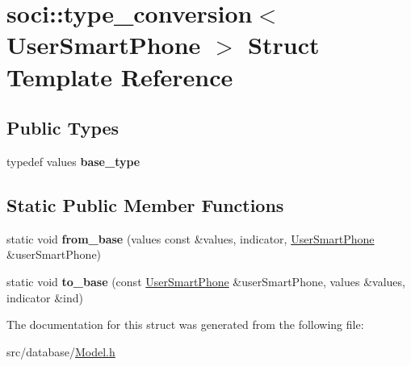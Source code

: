\hypertarget{structsoci_1_1type__conversion_3_01_user_smart_phone_01_4}{\section{soci\-:\-:type\-\_\-conversion$<$ User\-Smart\-Phone $>$ Struct Template Reference}
\label{structsoci_1_1type__conversion_3_01_user_smart_phone_01_4}
}
\subsection*{Public Types}
\begin{DoxyCompactItemize}
\item 
\hypertarget{structsoci_1_1type__conversion_3_01_user_smart_phone_01_4_abe60a4895d503867627343a2a70d5f0e}{typedef values {\bfseries base\-\_\-type}}\label{structsoci_1_1type__conversion_3_01_user_smart_phone_01_4_abe60a4895d503867627343a2a70d5f0e}

\end{DoxyCompactItemize}
\subsection*{Static Public Member Functions}
\begin{DoxyCompactItemize}
\item 
\hypertarget{structsoci_1_1type__conversion_3_01_user_smart_phone_01_4_af0791d54a9fa7f7cbec4f2ff6323758f}{static void {\bfseries from\-\_\-base} (values const \&values, indicator, \hyperlink{struct_user_smart_phone}{User\-Smart\-Phone} \&user\-Smart\-Phone)}\label{structsoci_1_1type__conversion_3_01_user_smart_phone_01_4_af0791d54a9fa7f7cbec4f2ff6323758f}

\item 
\hypertarget{structsoci_1_1type__conversion_3_01_user_smart_phone_01_4_ae7cd9b4240ee5042840d331a9415f83b}{static void {\bfseries to\-\_\-base} (const \hyperlink{struct_user_smart_phone}{User\-Smart\-Phone} \&user\-Smart\-Phone, values \&values, indicator \&ind)}\label{structsoci_1_1type__conversion_3_01_user_smart_phone_01_4_ae7cd9b4240ee5042840d331a9415f83b}

\end{DoxyCompactItemize}


The documentation for this struct was generated from the following file\-:\begin{DoxyCompactItemize}
\item 
src/database/\hyperlink{_model_8h}{Model.\-h}\end{DoxyCompactItemize}

